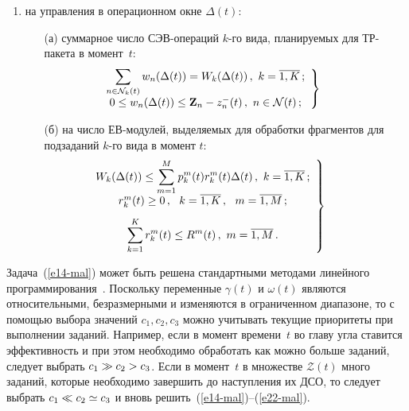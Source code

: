 \begin{multicols}{2}
\begin{enumerate}[(1)]
\item на управления в операционном окне $\Delta(t)$:
\begin{itemize}
\item[(а)] суммарное число СЭВ-опе\-ра\-ций $k$-го вида, планируемых  для ТР-пакета в момент~$t$:
\begin{equation}   
 \left.  \begin{array}{c}
 \hspace*{-10mm}\displaystyle\sum\limits_{n \in \mathcal{N}_k(t)} w_n (\Delta(t)) = W_{k} (\Delta(t))\,,  \ k = \overline {1,K}\,;\\[9pt]
  \hspace*{-10mm}0 \le  w_{n} (\Delta(t)) \le \mathbf{Z}_n - z_{n}^- (t)\,, \ n\in \mathcal{N}(t)\,;
                    \end{array}
                    \right \}  \label{e21-mal}
                    \end{equation}

\item[(б)] на число ЕВ-мо\-ду\-лей, выделяемых  для обработки фрагментов для подзаданий $k$-го вида в момент $t$:
\begin{equation} 
\left.  \begin{array}{c}
 \hspace*{-13mm}\displaystyle W_{k} (\Delta(t)) \le \sum\limits_{m = 1}^{M} p_{k}^m (t) r_{k}^m(t)  \Delta(t)\,, \ k = \overline {1,K}\,;\\[9pt]
 \hspace*{-13mm}r_k^m (t) \ge 0\,, \ \ k = \overline {1, K}\,, \ \ m = \overline{1,M}\,; \\[9pt]
 \hspace*{-13mm}\displaystyle\sum\limits_{k = 1}^{K} r_{k}^m (t) \le R^m(t)\,, \ m = \overline{1,M}\,.
                    \end{array}
                    \right \} \!\! \label{e22-mal}
                    \end{equation}
                    \end{itemize}
                    \end{enumerate}

Задача~(\ref{e14-mal}) может быть решена стандартными методами линейного
программирования~\cite{Dan}. Поскольку переменные $\gamma (t)$ и
$\omega(t)$ являются относительными, безразмерными и изменяются в
ограниченном диапазоне, то с помощью выбора значений $c_1, c_2, c_3$
можно учитывать текущие приоритеты при выполнении заданий. Например,
если в момент времени~$t$ во главу угла ставится эффективность и при
этом необходимо обработать как можно больше заданий, следует выбрать
$c_1 \hm\gg c_2 \hm> c_3$. Если  в момент~$t$ в множестве $\mathcal{Z}(t)$ много
заданий, которые необходимо завершить до наступления их ДСО, то
следует выбрать $c_1 \ll c_2 \hm\simeq c_3$ и вновь решить~(\ref{e14-mal})--(\ref{e22-mal}).


\end{multicols}
